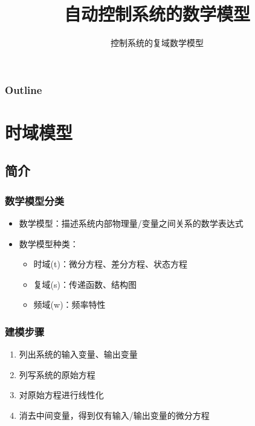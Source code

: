 \documentclass{article}
\subtitle{控制系统的复域数学模型}
\title{自动控制系统的数学模型}
\author{}
\date{}
\begin{document}
\maketitle

\begin{frame}
\frametitle{Outline}
\setcounter{tocdepth}{3}
\tableofcontents
\end{frame}











\section{时域模型}
\label{sec-1}
\subsection{简介}
\label{sec-1-1}
\begin{frame}
\frametitle{数学模型分类}
\label{sec-1-1-1}

\begin{itemize}
\item <2->数学模型：描述系统内部物理量/变量之间关系的数学表达式
\item <3->数学模型种类：
\begin{itemize}
\item <4->时域(t)：微分方程、差分方程、状态方程
\item <5->复域(s)：传递函数、结构图
\item <6->频域(w)：频率特性
\end{itemize}
\end{itemize}
\end{frame}
\begin{frame}
\frametitle{建模步骤}
\label{sec-1-1-2}

\begin{enumerate}
\item <2->列出系统的输入变量、输出变量
\item <3->列写系统的原始方程
\item <4->对原始方程进行线性化
\item <5->消去中间变量，得到仅有输入/输出变量的微分方程
\end{enumerate}
\end{frame}
\end{document}
